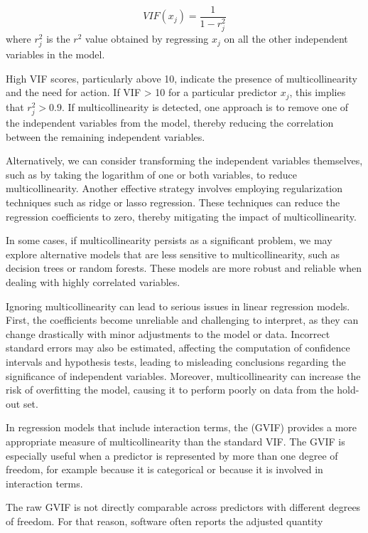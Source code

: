 \begin{equation}
  VIF(x_j) = \frac{1}{1 - r_j^2}
\end{equation}
where $r_j^2$ is the $r^2$ value obtained by regressing $x_j$ on all the other independent variables in the model. 

High VIF scores, particularly above 10, indicate the presence of multicollinearity and the need for action. If VIF > 10 for a particular predictor $x_j$, this implies that $r_j^2 > 0.9$. 
If multicollinearity is detected, one approach is to remove one of the independent variables from the model, thereby reducing the correlation between the remaining independent variables.

Alternatively, we can consider transforming the independent variables themselves, such as by taking the logarithm of one or both variables, to reduce multicollinearity.
Another effective strategy involves employing regularization techniques such as ridge or lasso regression. These techniques can reduce the regression coefficients to zero, thereby mitigating the impact of multicollinearity.

In some cases, if multicollinearity persists as a significant problem, we may explore alternative models that are less sensitive to multicollinearity, such as decision trees or random forests. These models are more robust and reliable when dealing with highly correlated variables.

Ignoring multicollinearity can lead to serious issues in linear regression models. First, the coefficients become unreliable and challenging to interpret, as they can change drastically with minor adjustments to the model or data. Incorrect standard errors may also be estimated, affecting the computation of confidence intervals and hypothesis tests, leading to misleading conclusions regarding the significance of independent variables. Moreover, multicollinearity can increase the risk of overfitting the model, causing it to perform poorly on data from the hold-out set.

\bigskip
In regression models that include interaction terms, the  (GVIF) provides a more appropriate measure of multicollinearity than the standard VIF. The GVIF is especially useful when a predictor is represented by more than one degree of freedom, for example because it is categorical or because it is involved in interaction terms.

The raw GVIF is not directly comparable across predictors with different degrees of freedom. For that reason, software often reports the adjusted quantity

